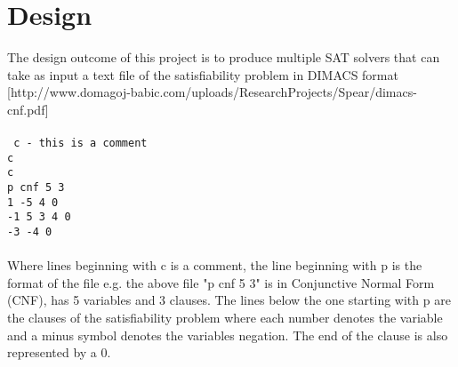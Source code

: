 \documentclass[12pt,a4paper]{article}
\begin{document}



\newpage
\section{Design}
The design outcome of this project is to produce multiple SAT solvers that can take as input a text file of the satisfiability problem in DIMACS format  \cite{dimacsFormat}[http://www.domagoj-babic.com/uploads/ResearchProjects/Spear/dimacs-cnf.pdf] \\\\
\texttt{
c - this is a comment\\
c \\
c \\
p cnf 5 3\\
1 -5 4 0\\
-1 5 3 4 0\\
-3 -4 0\\
}\\
Where lines beginning with c is a comment, the line beginning with p is the format of the file e.g. the above file "p cnf 5 3" is in Conjunctive Normal Form (CNF), has 5 variables and 3 clauses. The lines below the one starting with p are the clauses of the satisfiability problem where each number denotes the variable and a minus symbol denotes the variables negation. The end of the clause is also represented by a 0.\\\\
\end{document}
